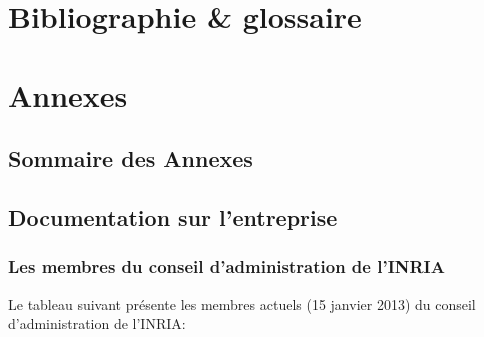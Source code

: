 \chapter{Bibliographie \& glossaire}
\chapter{Annexes}
  \section{Sommaire des Annexes}
  \section{Documentation sur l'entreprise}
  \subsection{Les membres du conseil d'administration de l'INRIA}
  Le tableau suivant présente les membres actuels (15 janvier 2013) du conseil
  d'administration de l'INRIA: \par
